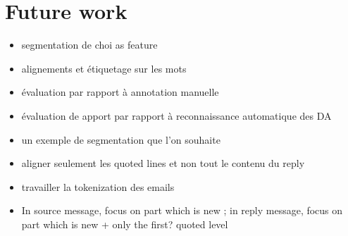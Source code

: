 

\section{Future work}
\label{sec:futureWork}

\begin{itemize}
\item segmentation de choi as feature
\item alignements et étiquetage sur les mots
\item évaluation par rapport à annotation manuelle
\item évaluation de apport par rapport à reconnaissance automatique des DA 
\item un exemple de segmentation que l'on souhaite
\item aligner seulement les quoted lines et non tout le contenu du reply
\item travailler la tokenization des emails
\item In source message, focus on part which is new ; in reply message, focus on part which is new + only the first? quoted level 
 
\end{itemize}
